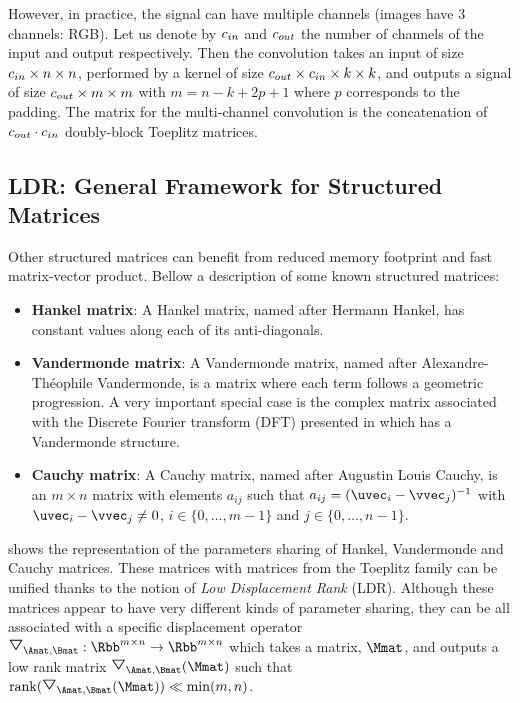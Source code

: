 However, in practice, the signal can have multiple channels (\eg images have 3 channels: RGB).
Let us denote by $c_{in}$ and $c_{out}$ the number of channels of the input and output respectively.
Then the convolution takes an input of size $c_{in} \times n \times n$, performed by a kernel of size $c_{out} \times c_{in} \times k \times k$, and outputs a signal of size $c_{out} \times m \times m$ with $m = n - k + 2p + 1$ where $p$ corresponds to the padding.
The matrix for the multi-channel convolution is the concatenation of $c_{out} \cdot c_{in}$ doubly-block Toeplitz matrices.





\subsection{LDR: General Framework for Structured Matrices}
\label{subsection:ch2-general_frameworks_for_structured_matrices}


Other structured matrices can benefit from reduced memory footprint and fast matrix-vector product.
Bellow a description of some known structured matrices: 
\begin{itemize}
  \item \textbf{Hankel matrix}: A Hankel matrix, named after Hermann Hankel, has constant values along each of its anti-diagonals.
  \item \textbf{Vandermonde matrix}: A Vandermonde matrix, named after Alexandre-Théophile Vandermonde, is a matrix where each term follows a geometric progression.
    A very important special case is the complex matrix associated with the Discrete Fourier transform (DFT) presented in  which has a Vandermonde structure.
  \item \textbf{Cauchy matrix}: A Cauchy matrix, named after Augustin Louis Cauchy, is an $m \times n$ matrix with elements $a_{ij}$ such that $a_{ij} = (\uvec_i - \vvec_j)^{-1}$ with $\uvec_i - \vvec_j \neq 0$, $i \in \{0,\dots,m-1\}$ and $j \in \{0,\dots,n-1\}$.
\end{itemize}
 shows the representation of the parameters sharing of Hankel, Vandermonde and Cauchy matrices.
These matrices with matrices from the Toeplitz family can be unified thanks to the notion of \emph{Low Displacement Rank} (LDR).
Although these matrices appear to have very different kinds of parameter sharing, they can be all associated with a specific displacement operator $\triangleopdown_{\Amat, \Bmat}: \Rbb^{m \times n} \rightarrow \Rbb^{m \times n}$ which takes a matrix, $\Mmat$, and outputs a low rank matrix $\triangleopdown_{\Amat, \Bmat}(\Mmat)$ such that $\rank(\triangleopdown_{\Amat, \Bmat}(\Mmat)) \ll \min(m,n)$.


